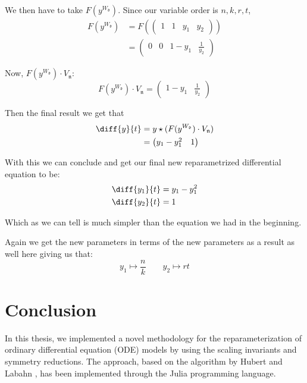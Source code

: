 \documentclass[oneside, a4paper, onecolumn, 11pt]{article}
\begin{document}
We then have to take \(F(y^{W_{\mathfrak{d}}})\). Since our variable order is \(n, k, r, t\),
\begin{align*}
    F(y^{W_{\mathfrak{d}}})
     & = F(\begin{pmatrix}
               1 & 1 & y_1 & y_2
           \end{pmatrix})             \\
     & = \begin{pmatrix}
             0 & 0 & 1 - y_1 & \frac{1}{y_2}
         \end{pmatrix}
\end{align*}

Now, \(F(y^{W_{\mathfrak{d}}}) \cdot V_{\mathfrak{n}}\):
\[
    F(y^{W_{\mathfrak{d}}}) \cdot V_{\mathfrak{n}} =
    \begin{pmatrix}
        1 - y_1 & \frac{1}{y_2}
    \end{pmatrix}
\]

Then the final result we get that
\begin{align*}
    \diff{y}{t}
     & = y \star (F(y^{W_{\mathfrak{d}}}) \cdot V_{\mathfrak{n}}) \\
     & = \begin{pmatrix} y_1 - y_1^2 & 1 \end{pmatrix}
\end{align*}

With this we can conclude and get our final new reparametrized differential equation to be:
\begin{align*}
    \diff{y_1}{t} & = y_1 - y_1^2 \\
    \diff{y_2}{t} & = 1
\end{align*}

Which as we can tell is much simpler than the equation we had in the beginning.

Again we get the new parameters in terms of the new parameters as a result as well here giving us that:
\[
    y_1 \mapsto \frac{n}{k} \qquad
    y_2 \mapsto r t
\]


\section{Conclusion}

In this thesis, we implemented a novel methodology for the reparameterization of ordinary differential equation (ODE) models by using the scaling invariants and symmetry reductions. The approach, based on the algorithm by Hubert and Labahn \cite{Hubert2013}, has been implemented through the Julia programming language.
\end{document}
